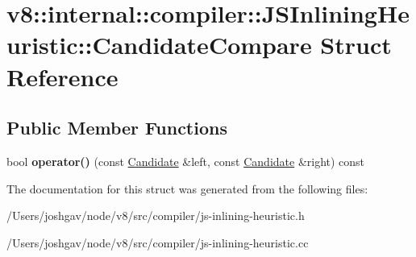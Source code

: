 \hypertarget{structv8_1_1internal_1_1compiler_1_1_j_s_inlining_heuristic_1_1_candidate_compare}{}\section{v8\+:\+:internal\+:\+:compiler\+:\+:J\+S\+Inlining\+Heuristic\+:\+:Candidate\+Compare Struct Reference}
\label{structv8_1_1internal_1_1compiler_1_1_j_s_inlining_heuristic_1_1_candidate_compare}
\subsection*{Public Member Functions}
\begin{DoxyCompactItemize}
\item 
bool {\bfseries operator()} (const \hyperlink{structv8_1_1internal_1_1compiler_1_1_j_s_inlining_heuristic_1_1_candidate}{Candidate} \&left, const \hyperlink{structv8_1_1internal_1_1compiler_1_1_j_s_inlining_heuristic_1_1_candidate}{Candidate} \&right) const \hypertarget{structv8_1_1internal_1_1compiler_1_1_j_s_inlining_heuristic_1_1_candidate_compare_a87e0a2ed414bb883c05af22c88274154}{}\label{structv8_1_1internal_1_1compiler_1_1_j_s_inlining_heuristic_1_1_candidate_compare_a87e0a2ed414bb883c05af22c88274154}

\end{DoxyCompactItemize}


The documentation for this struct was generated from the following files\+:\begin{DoxyCompactItemize}
\item 
/\+Users/joshgav/node/v8/src/compiler/js-\/inlining-\/heuristic.\+h\item 
/\+Users/joshgav/node/v8/src/compiler/js-\/inlining-\/heuristic.\+cc\end{DoxyCompactItemize}
